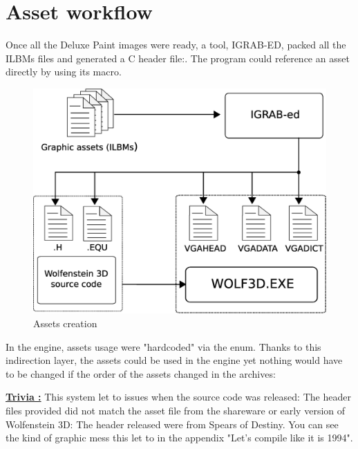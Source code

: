 \documentclass[book.tex]{subfiles}
\begin{document}
\section{Asset workflow}
Once all the Deluxe Paint images were ready, a tool, IGRAB-ED, packed all the ILBMs files and generated a C header file:. The program could reference an asset directly by using its macro.\\
\begin{figure}[H]
\centering
 \includegraphics[width=\textwidth]{imgs/drawing_plain.eps}
 \caption{Assets creation} 
 \end{figure}

\begin{minipage}{\textwidth}
 \par
 \end{minipage}
 
 In the engine, assets usage were "hardcoded" via the enum. Thanks to this indirection layer, the assets could be used in the engine yet nothing would have to be changed if the order of the assets changed in the  archives:\\
 \par
 \begin{minipage}{\textwidth}
 \par
 \end{minipage}
\par
\textbf{\underline{Trivia :}} This system let to issues when the source code was released: The  header files provided did not match the asset file from the shareware or early version of Wolfenstein 3D: The header released were from Spears of Destiny. You can see the kind of graphic mess this let to in the appendix "Let's compile like it is 1994".\\
\end{document}
